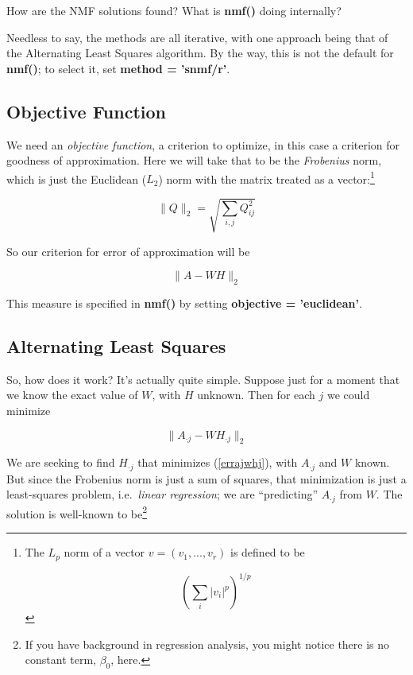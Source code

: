 How are the NMF solutions found?  What is {\bf nmf()} doing internally?

Needless to say, the methods are all iterative, with one approach being
that of the Alternating Least Squares algorithm.  By the way, this is
not the default for {\bf nmf()}; to select it, set {\bf method =
'snmf/r'}.

\subsection{Objective Function}

We need an {\it objective function}, a criterion to optimize, in this
case a criterion for goodness of approximation. Here we will take that
to be the {\it Frobenius} norm, which is just the Euclidean ($L_2$)
norm with the matrix treated as a vector:\footnote{The $L_p$ norm of a
vector $v = (v_1,...,v_r)$ is defined to be

$$
\left (\sum_i |v_i|^p \right )^{1/p}
$$
}

\begin{equation}
\|Q\|_2 = 
\sqrt{
\sum_{i,j} Q_{ij}^2
}
\end{equation}

So our criterion for error of approximation will be

\begin{equation}
\label{errawh}
\|A - WH\|_2
\end{equation}

This measure is specified in {\bf nmf()} by setting {\bf objective =
'euclidean'}.

\subsection{Alternating Least Squares}

So, how does it work?  It's actually quite simple.  Suppose just for a
moment that we know the exact value of $W$, with $H$ unknown.  Then for
each $j$ we could minimize

\begin{equation}
\label{errajwhj}
\|A_{\cdot j} - W H_{\cdot j}\|_2
\end{equation}

We are seeking to find $H_{\cdot j}$ that minimizes (\ref{errajwhj}),
with $A_{\cdot j}$ and $W$ known.  But since the Frobenius norm is just
a sum of squares, that minimization is just a least-squares problem,
i.e.\ {\it linear regression}; we are ``predicting'' $A_{\cdot j}$ from
$W$.  The solution is well-known to be\footnote{If you have background
in regression analysis, you might notice there is no constant term,
$\beta_0$, here.}

